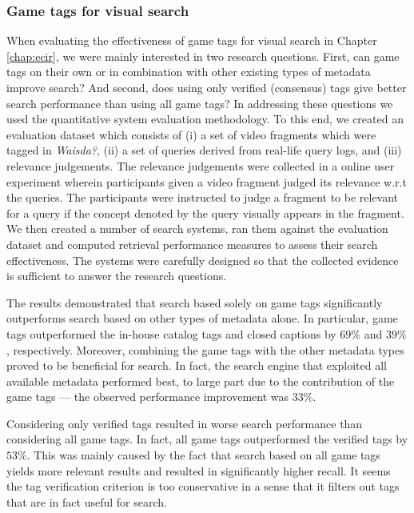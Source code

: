 \subsubsection{Game tags for visual search}
When evaluating the effectiveness of game tags for visual search in Chapter \ref{chap:ecir}, we were mainly interested in two research questions. First, can game tags on their own or in combination with other existing types of metadata improve search? And second, does using only verified (consensus) tags give better search performance than using all game tags? In addressing these questions we used the quantitative system evaluation methodology. To this end, we created an evaluation dataset which consists of (i) a set of video fragments which were tagged in \textit{Waisda?}, (ii) a set of queries derived from real-life query logs, and (iii) relevance judgements. The relevance judgements were collected in a online user experiment wherein participants given a video fragment judged its relevance w.r.t the queries. The participants were instructed to judge a fragment to be relevant for a query if the concept denoted by the query visually appears in the fragment. We then created a number of search systems, ran them against the evaluation dataset and computed retrieval performance measures to assess their search effectiveness. The systems were carefully designed so that the collected evidence is sufficient to answer the research questions.

The results demonstrated that search based solely on game tags significantly outperforms search based on other types of metadata alone. In particular, game tags outperformed the in-house catalog tags and closed captions by $69\%$ and $39\%$, respectively. Moreover, combining the game tags with the other metadata types proved to be beneficial for search. In fact, the search engine that exploited all available metadata performed best, to large part due to the contribution of the game tags --- the observed performance improvement was $33\%$.

Considering only verified tags resulted in worse search performance than considering all game tags. In fact, all game tags outperformed the verified tags by $53\%$. This was mainly caused by the fact that search based on all game tags yields more relevant results and resulted in significantly higher recall. It seems the tag verification criterion is too conservative in a sense that it filters out tags that are in fact useful for search.

